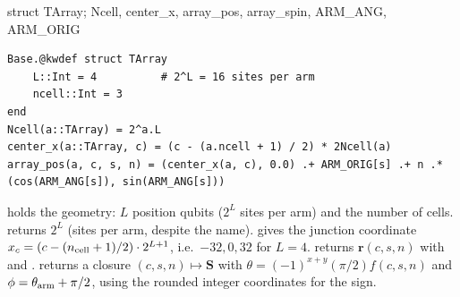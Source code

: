 \begin{function}{struct TArray; Ncell, center\_x, array\_pos, array\_spin, ARM\_ANG, ARM\_ORIG}
\begin{Verbatim}
Base.@kwdef struct TArray
    L::Int = 4          # 2^L = 16 sites per arm
    ncell::Int = 3
end
Ncell(a::TArray) = 2^a.L
center_x(a::TArray, c) = (c - (a.ncell + 1) / 2) * 2Ncell(a)
array_pos(a, c, s, n) = (center_x(a, c), 0.0) .+ ARM_ORIG[s] .+ n .* (cos(ARM_ANG[s]), sin(ARM_ANG[s]))
\end{Verbatim}
 holds the geometry: $L$ position qubits ($2^L$ sites per arm) and the number of cells.  returns $2^L$ (sites per
arm, despite the name).  gives the junction coordinate $x_c = (c - (n_{\rm cell}+1)/2)\cdot 2^{L+1}$, i.e.\ $-32, 0, 32$ for
$L = 4$.  returns $\mathbf r(c,s,n)$ with  and .
 returns a closure $(c,s,n)\mapsto\mathbf S$ with $\theta = (-1)^{x+y}(\pi/2)f(c,s,n)$ and
$\phi = \theta_{\rm arm} + \pi/2$, using the rounded integer coordinates for the sign.
\end{function}

